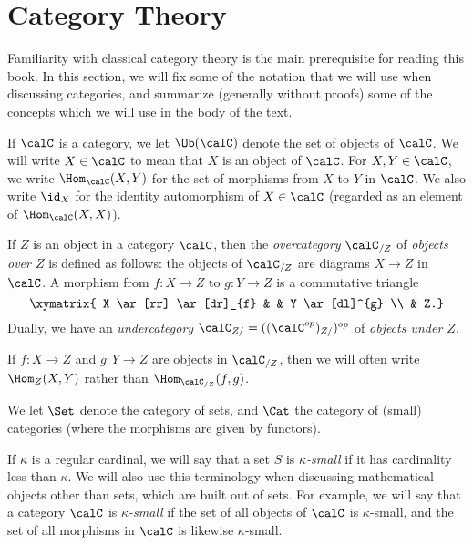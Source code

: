 
\section{Category Theory}\label{catreview}

\setcounter{theorem}{0}

Familiarity with classical category theory is the main prerequisite for reading this book.
In this section, we will fix some of the notation that we will use when discussing categories, and summarize (generally without proofs) some of the concepts which we will use in the body of the text.

If $\calC$ is a category, we let $\Ob(\calC)$ denote the set of objects of $\calC$. We will write $X \in \calC$ to
mean that $X$ is an object of $\calC$. For $X,Y \in \calC$, we write $\Hom_{\calC}(X,Y)$ for the set of morphisms from $X$ to $Y$ in $\calC$. We also write
$\id_X$ for the identity automorphism of $X \in \calC$ (regarded as an element of $\Hom_{\calC}(X,X)$).

If $Z$ is an object in a category $\calC$, then the {\it overcategory}
$\calC_{/Z}$ of {\it objects over $Z$} is defined as follows: the
objects of $\calC_{/Z}$ are diagrams $X \rightarrow Z$ in $\calC$. A morphism
from $f: X \rightarrow Z$ to $g: Y \rightarrow Z$ is a commutative triangle
$$ \xymatrix{ X \ar[rr] \ar[dr]_{f} & & Y \ar[dl]^{g} \\
& Z.}$$
Dually, we have an {\it undercategory} $\calC_{Z/} = ((\calC^{op})_{Z/})^{op}$ of {\em objects under $Z$}.

If $f: X \rightarrow Z$ and $g: Y \rightarrow Z$ are objects in
$\calC_{/Z}$, then we will often write $\Hom_{Z}(X,Y)$ rather than
$\Hom_{\calC_{/Z}}(f,g)$.

We let $\Set$ denote the category of sets, and $\Cat$ the category of (small) categories (where the morphisms are given by functors).

If $\kappa$ is a regular cardinal, we will say that a set $S$ is {\it $\kappa$-small} if it has cardinality less than $\kappa$. We will also use this terminology when discussing mathematical objects other than sets, which are built out of sets. For example, we will say that a category $\calC$ is {\it $\kappa$-small} if the set of all objects of $\calC$ is $\kappa$-small, and the set of all morphisms in $\calC$ is likewise $\kappa$-small.

